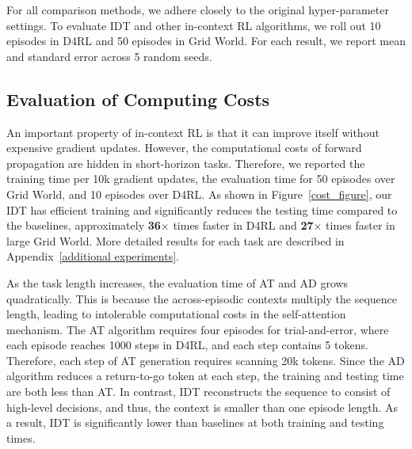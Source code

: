 For all comparison methods, we adhere closely to the original hyper-parameter settings. To evaluate IDT and other in-context RL algorithms, we roll out 10 episodes in D4RL and 50 episodes in Grid World. For each result, we report mean and standard error across 5 random seeds.


\subsection{Evaluation of Computing Costs}
An important property of in-context RL is that it can improve itself without expensive gradient updates. However, the computational costs of forward propagation are hidden in short-horizon tasks. Therefore, we reported the training time per 10k gradient updates, the evaluation time for 50 episodes over Grid World, and 10 episodes over D4RL. As shown in Figure~\ref{cost_figure}, our IDT has efficient training and significantly reduces the testing time compared to the baselines, approximately \textbf{36$\bm\times$} times faster in D4RL and \textbf{27$\bm\times$} times faster in large Grid World. More detailed results for each task are described in Appendix~\ref{additional experiments}.

As the task length increases, the evaluation time of AT and AD grows quadratically.
This is because the across-episodic contexts multiply the sequence length, leading to intolerable computational costs in the self-attention mechanism. The AT algorithm requires four episodes for trial-and-error, where each episode reaches 1000 steps in D4RL, and each step contains 5 tokens. 
Therefore, each step of AT generation requires scanning 20k tokens.
Since the AD algorithm reduces a return-to-go token at each step, the training and testing time are both less than AT.
In contrast, IDT reconstructs the sequence to consist of high-level decisions, and thus, the context is smaller than one episode length. As a result, IDT is significantly lower than baselines at both training and testing times.


